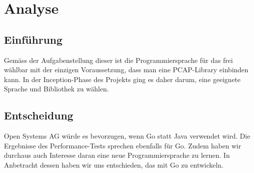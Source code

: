 \chapter{Analyse}
\label{chap:Analyse}


\section{Einführung}
Gemäss der Aufgabenstellung dieser \work{} ist die Programmiersprache für das \tool{} frei wählbar mit der einzigen Voraussetzung, dass man eine \acs{PCAP}-Library einbinden kann. In der Inception-Phase des Projekts ging es daher darum, eine geeignete Sprache und Bibliothek zu wählen.







\section{Entscheidung}
Open Systems AG würde es bevorzugen, wenn Go statt Java verwendet wird. Die Ergebnisse des Performance-Tests sprechen ebenfalls für Go. Zudem haben wir durchaus auch Interesse daran eine neue Programmiersprache zu lernen.
In Anbetracht dessen haben wir uns entschieden, das \tool{} mit Go zu entwickeln.



